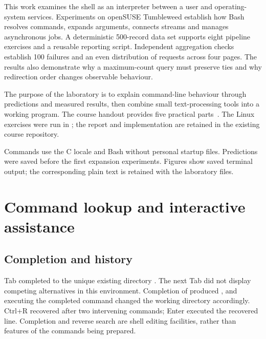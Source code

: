 \documentclass{../latex/utmreport}
\begin{document}
\makeutmreporttitlepage
\tableofcontents
\clearpage
\begin{utmabstract}[Abstract]
This work examines the shell as an interpreter between a user and operating-system
services. Experiments on openSUSE Tumbleweed establish how Bash resolves commands,
expands arguments, connects streams and manages asynchronous jobs. A deterministic
500-record data set supports eight pipeline exercises and a reusable reporting
script. Independent aggregation checks establish 100 failures and an even distribution
of requests across four pages. The results also demonstrate why a maximum-count
query must preserve ties and why redirection order changes observable behaviour.
\end{utmabstract}
\utmintroduction
The purpose of the laboratory is to explain command-line behaviour through
predictions and measured results, then combine small text-processing tools into a
working program. The course handout provides five practical parts~\cite{handout}.
The Linux exercises were run in ; the report and implementation
are retained in the existing course repository.

Commands use the C locale and Bash without personal startup files. Predictions
were saved before the first expansion experiments. Figures show saved terminal
output; the corresponding plain text is retained with the laboratory files.

\chapter{Command lookup and interactive assistance}
\section{Completion and history}
Tab completed  to the unique existing directory .
The next Tab did not display competing alternatives in this environment.
Completion of  produced , and executing the completed
 command changed the working directory accordingly.
Ctrl+R recovered  after two intervening commands;
Enter executed the recovered line. Completion and reverse search are shell editing
facilities, rather than features of the commands being prepared.
\end{document}
